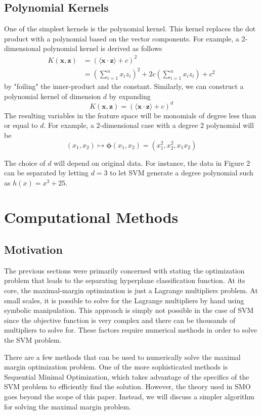 \documentclass{article}
\newcommand{\bphi}{\bm{\phi}}
\begin{document}
\subsection{Polynomial Kernels}
One of the simplest kernels is the polynomial kernel. This kernel replaces the dot product with a polynomial based on the vector components. For example, a 2-dimensional polynomial kernel is derived as follows
\begin{align*}
 K(\mathbf{x}, \mathbf{z}) &= (\langle \mathbf{x} \cdot \mathbf{z} \rangle+c)^2\\
 &= \left( \sum_{i=1}^n x_i z_i \right)^2+2c\left( \sum_{i=1}^n x_i z_i \right)+c^2
\end{align*}
by "foiling" the inner-product and the constant. Similarly, we can construct a polynomial kernel of dimension $d$ by expanding
$$ K(\mathbf{x}, \mathbf{z}) = (\langle \mathbf{x} \cdot \mathbf{z} \rangle+c)^d $$
The resulting variables in the feature space will be monomials of degree less than or equal to $d$. For example, a 2-dimensional case with a degree 2 polynomial will be
$$ (x_1, x_2) \mapsto \bphi(x_1, x_2) = (x_1^2,x_2^2, x_1x_2)$$

The choice of $d$ will depend on original data. For instance, the data in Figure 2 can be separated by letting $d=3$ to let SVM generate a degree polynomial such as $h(x) = x^3+25$. 

\section{Computational Methods}
\subsection{Motivation}
The previous sections were primarily concerned with stating the optimization problem that leads to the separating hyperplane classification function. At its core, the maximal-margin optimization is just a Lagrange multipliers problem. At small scales, it is possible to solve for the Lagrange multipliers by hand using symbolic manipulation. This approach is simply not possible in the case of SVM since the objective function is very complex and there can be thousands of multipliers to solve for. These factors require numerical methods in order to solve the SVM problem.

There are a few methods that can be used to numerically solve the maximal margin optimization problem. One of the more sophisticated methods is Sequential Minimal Optimization, which takes advantage of the specifics of the SVM problem to efficiently find the solution. However, the theory used in SMO goes beyond the scope of this paper. Instead, we will discuss a simpler algorithm for solving the maximal margin problem.
\end{document}
